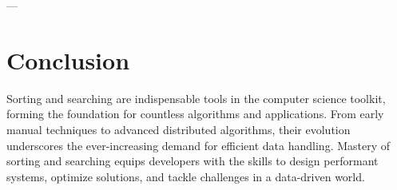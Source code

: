 ---

\section*{Conclusion}

Sorting and searching are indispensable tools in the computer science toolkit, forming the foundation for countless algorithms and applications. From early manual techniques to advanced distributed algorithms, their evolution underscores the ever-increasing demand for efficient data handling. Mastery of sorting and searching equips developers with the skills to design performant systems, optimize solutions, and tackle challenges in a data-driven world.